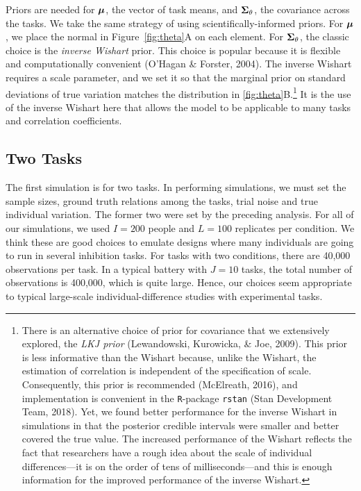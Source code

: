 \documentclass[
  english,
  ,man]{apa6}
\begin{document}
Priors are needed for \(\bm \mu\), the vector of task means, and \(\bm \Sigma_\theta\), the covariance across the tasks. We take the same strategy of using scientifically-informed priors. For \(\bm \mu\), we place the normal in Figure~\ref{fig:theta}A on each element. For \(\bm \Sigma_\theta\), the classic choice is the \emph{inverse Wishart} prior. This choice is popular because it is flexible and computationally convenient (O'Hagan \& Forster, 2004). The inverse Wishart requires a scale parameter, and we set it so that the marginal prior on standard deviations of true variation matches the distribution in \ref{fig:theta}B.\footnote{There is an alternative choice of prior for covariance that we extensively explored, the \emph{LKJ prior} (Lewandowski, Kurowicka, \& Joe, 2009). This prior is less informative than the Wishart because, unlike the Wishart, the estimation of correlation is independent of the specification of scale. Consequently, this prior is recommended (McElreath, 2016), and implementation is convenient in the \texttt{R}-package \texttt{rstan} (Stan Development Team, 2018). Yet, we found better performance for the inverse Wishart in simulations in that the posterior credible intervals were smaller and better covered the true value. The increased performance of the Wishart reflects the fact that researchers have a rough idea about the scale of individual differences---it is on the order of tens of milliseconds---and this is enough information for the improved performance of the inverse Wishart.} It is the use of the inverse Wishart here that allows the model to be applicable to many tasks and correlation coefficients.

\hypertarget{two-tasks}{%
\subsection{Two Tasks}\label{two-tasks}}

The first simulation is for two tasks. In performing simulations, we must set the sample sizes, ground truth relations among the tasks, trial noise and true individual variation. The former two were set by the preceding analysis. For all of our simulations, we used \(I=200\) people and \(L=100\) replicates per condition. We think these are good choices to emulate designs where many individuals are going to run in several inhibition tasks. For tasks with two conditions, there are 40,000 observations per task. In a typical battery with \(J=10\) tasks, the total number of observations is 400,000, which is quite large. Hence, our choices seem appropriate to typical large-scale individual-difference studies with experimental tasks.
\end{document}
